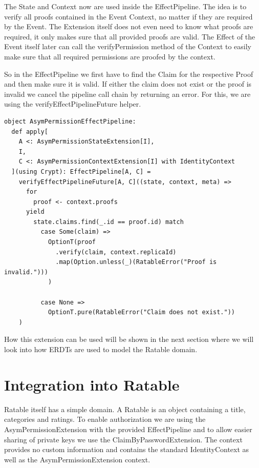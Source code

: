 \documentclass[
	ngerman,
	ruledheaders=section,   %
	class=report,		    %
	thesis={type=bachelor}, %
	accentcolor=9c,			%
	custommargins=true,    %
	marginpar=false,        %
	parskip=half-,          %
	fontsize=11pt,          %
]{tudapub}
\begin{document}
The State and Context now are used inside the EffectPipeline. The idea is to verify all proofs contained in the Event Context, no matter if they are required by the Event. The Extension itself does not even need to know what proofs are required, it only makes sure that all provided proofs are valid. The Effect of the Event itself later can call the verifyPermission method of the Context to easily make sure that all required permissions are proofed by the context.

So in the EffectPipeline we first have to find the Claim for the respective Proof and then make sure it is valid. If either the claim does not exist or the proof is invalid we cancel the pipeline call chain by returning an error. For this, we are using the verifyEffectPipelineFuture helper.

\begin{lstlisting}
object AsymPermissionEffectPipeline:
  def apply[
    A <: AsymPermissionStateExtension[I], 
    I, 
    C <: AsymPermissionContextExtension[I] with IdentityContext
  ](using Crypt): EffectPipeline[A, C] =
    verifyEffectPipelineFuture[A, C]((state, context, meta) =>
      for
        proof <- context.proofs
      yield
        state.claims.find(_.id == proof.id) match
          case Some(claim) => 
            OptionT(proof
              .verify(claim, context.replicaId)
              .map(Option.unless(_)(RatableError("Proof is invalid.")))
            )

          case None => 
            OptionT.pure(RatableError("Claim does not exist."))
    )
\end{lstlisting}

How this extension can be used will be shown in the next section where we will look into how ERDTs are used to model the Ratable domain.

\section{Integration into Ratable}
Ratable itself has a simple domain. A Ratable is an object containing a title, categories and ratings. To enable authorization we are using the AsymPermissionExtension with the provided EffectPipeline and to allow easier sharing of private keys we use the ClaimByPasswordExtension. The context provides no custom information and contains the standard IdentityContext as well as the AsymPermissionExtension context.
\end{document}
